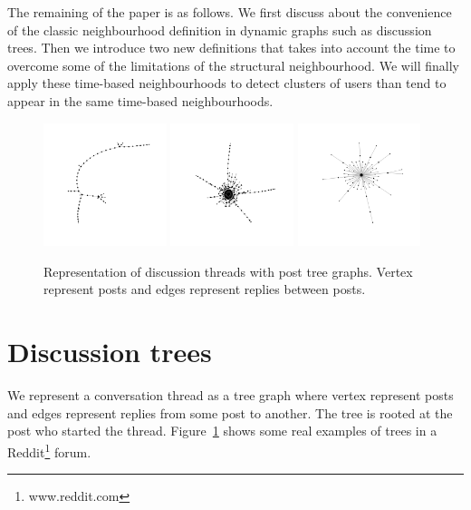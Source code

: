 \documentclass[9pt,technote]{IEEEtran}
\begin{document}
The remaining of the paper is as follows. We first discuss about the convenience of the classic neighbourhood definition in dynamic graphs such as discussion trees. Then we introduce two new definitions that takes into account the time to overcome some of the limitations of the structural neighbourhood. We will finally apply these time-based neighbourhoods to detect clusters of users than tend to appear in the same time-based neighbourhoods.

\begin{figure}
	\centering
	\includegraphics[width=0.32\textwidth]{tree1}
	\includegraphics[width=0.32\textwidth]{tree2}
	\includegraphics[width=0.32\textwidth]{tree3}
	\caption{Representation of discussion threads with post tree graphs. Vertex represent posts and edges represent replies between posts.}
	\label{fig:trees}
\end{figure}

\section{Discussion trees}
We represent a conversation thread as a tree graph where vertex represent posts and edges represent replies from some post to another. The tree is rooted at the post who started the thread. Figure~\ref{fig:trees} shows some real examples of trees in a Reddit\footnote{www.reddit.com} forum. 
\end{document}
